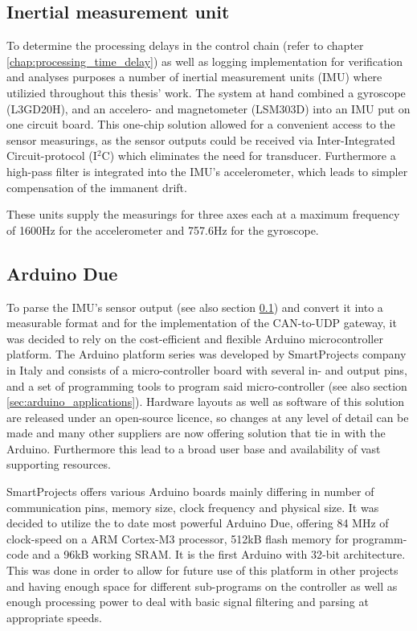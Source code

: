 \documentclass[ExampleMasters.tex]{subfiles}
\begin{document}
\subsection{Inertial measurement unit}
\label{sec:IMU}
To determine the processing delays in the control chain (refer to chapter \ref{chap:processing_time_delay}) as well as logging implementation for verification and analyses purposes a number of inertial measurement units (IMU) where utilizied throughout this thesis' work. The system at hand combined a gyroscope (L3GD20H), and an accelero- and magnetometer (LSM303D) into an IMU put on one circuit board.\cite{IMU_homepage_shop} This one-chip solution allowed for a convenient access to the sensor measurings, as the sensor outputs could be received via Inter-Integrated Circuit-protocol (I$^{2}$C)  which eliminates the need for transducer. Furthermore a high-pass filter is integrated into the IMU's accelerometer, which leads to simpler compensation of the immanent drift. 

These units supply the measurings for three axes each at a maximum frequency of 1600Hz for the accelerometer and 757.6Hz for the gyroscope. \cite{accelerometer_datasheet}\cite{gyrometer_datasheet}


\subsection{Arduino Due}
\label{sec:arduino}

To parse the IMU's sensor output (see also section \ref{sec:IMU}) and convert it into a measurable format and for the implementation of the CAN-to-UDP gateway, it was decided to rely on the cost-efficient and flexible Arduino microcontroller platform. The Arduino platform series was developed by  SmartProjects company in Italy and consists of a micro-controller board with several in- and output pins, and a set of programming tools to program said micro-controller (see also section \ref{sec:arduino_applications}). Hardware layouts as well as software of this solution are released under an open-source licence, so changes at any level of detail can be made and many other suppliers are now offering solution that tie in with the Arduino. Furthermore this lead to a broad user base and availability of vast supporting resources.

SmartProjects offers various Arduino boards mainly differing in number of communication pins, memory size, clock frequency and physical size. It was decided to utilize the to date most powerful Arduino Due, offering 84 MHz of clock-speed on a ARM Cortex-M3 processor, 512kB flash memory for programm-code and a 96kB working SRAM. It is the first Arduino with 32-bit architecture. This was done in order to allow for future use of this platform in other projects and having enough space for different sub-programs on the controller as well as enough processing power to deal with basic signal filtering and parsing at appropriate speeds. 
\end{document}
